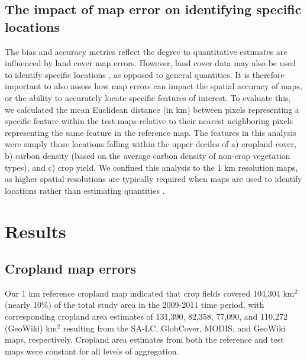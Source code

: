 \documentclass[a4paper]{article}
\begin{document}
\vspace{-0.3 cm}
\subsection*{The impact of map error on identifying specific locations}
\vspace{-0.2 cm}
The bias and accuracy metrics reflect the degree to quantitative estimates are influenced by land cover map errors. However, land cover data may also be used to identify specific locations \citep[e.g. areas of high agricultural potential and low ecological cost;][]{estes_reconciling_2016}, as opposed to general quantities. It is therefore important to also assess how map errors can impact the spatial accuracy of maps, or the ability to accurately locate specific features of interest. To evaluate this, we calculated the mean Euclidean distance (in km) between pixels representing a specific feature within the test maps relative to their nearest neighboring pixels representing the same feature in the reference map. The features in this analysis were simply those locations falling within the upper deciles of a) cropland cover, b) carbon density (based on the average carbon density of non-crop vegetation types), and c) crop yield. We confined this analysis to the 1 km resolution maps, as higher spatial resolutions are typically required when maps are used to identify locations rather than estimating quantities \citep[e.g.][]{estes_reconciling_2016}.  

\vspace{-0.5 cm}
\section*{Results}
\vspace{-0.3 cm}
\subsection*{Cropland map errors}
\vspace{-0.2 cm}
Our 1 km reference cropland map indicated that crop fields covered 104,304 km$^2$ (nearly 10\%) of the total study area in the 2009-2011 time period, with corresponding cropland area estimates of 131,390, 82,358, 77,090, and 110,272 (GeoWiki) km$^2$ resulting from the SA-LC, GlobCover, MODIS, and GeoWiki maps, respectively. Cropland area estimates from both the reference and test maps were constant for all levels of aggregation. 
\end{document}
